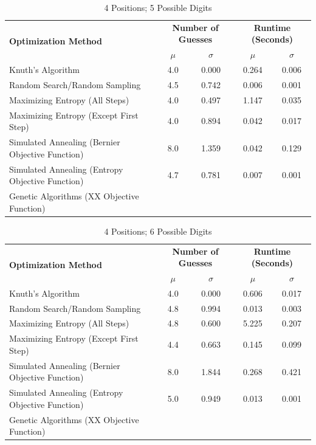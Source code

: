 \documentclass[11pt]{article}
\begin{document}
\begin{table}[h!]
\begin{center}
\begin{tabular}{l c c c c}
\toprule
\multirow{2}{*}{\bfseries Optimization Method} 		& \multicolumn{2}{c}{\bfseries Number of Guesses} 		& \multicolumn{2}{c}{\bfseries Runtime (Seconds)}	\\
\cmidrule(lr){2-3}  \cmidrule(lr){4-5}				& $\mu$ & $\sigma$								& $\mu$ & $\sigma$							\\
\cmidrule(lr){1-5}
Knuth's Algorithm							& 4.0 & 0.000									& 0.264 & 0.006							\\
Random Search/Random Sampling				& 4.5 & 0.742									& 0.006 & 0.001							\\
Maximizing Entropy (All Steps)					& 4.0 & 0.497									& 1.147 & 0.035							\\
Maximizing Entropy (Except First Step)			& 4.0 & 0.894									& 0.042 &	0.017							\\
Simulated Annealing (Bernier Objective Function)	& 8.0 & 1.359									& 0.042 & 0.129							\\
Simulated Annealing (Entropy Objective Function)	& 4.7 & 0.781									& 0.007 & 0.001							\\
Genetic Algorithms (XX Objective Function)		& &											& &										\\
\bottomrule
\end{tabular}
\end{center}
\caption{4 Positions; 5 Possible Digits}
\label{fig:compare_4_5}
\end{table}

\begin{table}[h!]
\begin{center}
\begin{tabular}{l c c c c}
\toprule
\multirow{2}{*}{\bfseries Optimization Method} 		& \multicolumn{2}{c}{\bfseries Number of Guesses} 		& \multicolumn{2}{c}{\bfseries Runtime (Seconds)}	\\
\cmidrule(lr){2-3}  \cmidrule(lr){4-5}				& $\mu$ & $\sigma$								& $\mu$ & $\sigma$							\\
\cmidrule(lr){1-5}
Knuth's Algorithm							& 4.0 & 0.000									& 0.606 & 0.017							\\
Random Search/Random Sampling				& 4.8 & 0.994									& 0.013 & 0.003							\\
Maximizing Entropy (All Steps)					& 4.8 & 0.600									& 5.225 & 0.207							\\
Maximizing Entropy (Except First Step)			& 4.4 & 0.663									& 0.145 & 0.099							\\
Simulated Annealing (Bernier Objective Function)	& 8.0 & 1.844									& 0.268 & 0.421							\\
Simulated Annealing (Entropy Objective Function)	& 5.0 & 0.949									& 0.013 & 0.001							\\
Genetic Algorithms (XX Objective Function)		& &											& &										\\
\bottomrule
\end{tabular}
\end{center}
\caption{4 Positions; 6 Possible Digits}
\label{fig:compare_4_6}
\end{table}
\end{document}
